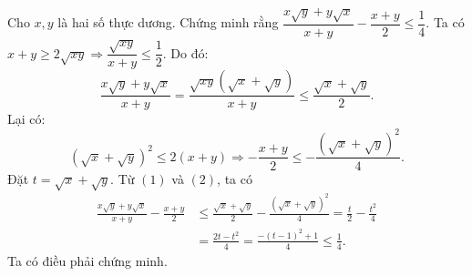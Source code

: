 \begin{ex}%
Cho $x, y$ là hai số thực dương. Chứng minh rằng
$\dfrac{x\sqrt y  + y\sqrt x }{x + y} - \dfrac{x + y}{2} \le \dfrac{1}{4}$.
\loigiai
    {
Ta có $x + y \ge 2\sqrt {xy}  \Rightarrow \dfrac{\sqrt {xy} }{x + y} \le \dfrac{1}{2}$. Do đó:
\[\frac{x\sqrt y  + y\sqrt x }{x + y} = \frac{\sqrt {xy} \left( \sqrt x  + \sqrt y  \right)}{x + y} \le \frac{\sqrt x  + \sqrt y }{2}.\tag{1}\]
Lại có:
\[(\sqrt x  + \sqrt y )^2 \le 2\left( x + y \right) \Rightarrow  - \frac{x + y}{2} \le  - \frac{(\sqrt x  + \sqrt y )^2}{4}.\tag{2}\]
Đặt $t = \sqrt x  + \sqrt y $. Từ $(1)$ và $(2)$, ta có
{\allowdisplaybreaks
\begin{align*} 
\frac{x\sqrt y  + y\sqrt x }{x + y} - \frac{x + y}{2} &\le \frac{\sqrt x  + \sqrt y }{2} - \frac{(\sqrt x  + \sqrt y )^2}{4} = \frac{t}{2} - \frac{t^2}{4} \\
&= \frac{2t - t^2}{4} = \frac{ - (t - 1)^2 + 1}{4} \le \frac{1}{4}.
\end{align*}}Ta có điều phải chứng minh.
    }
\end{ex}

